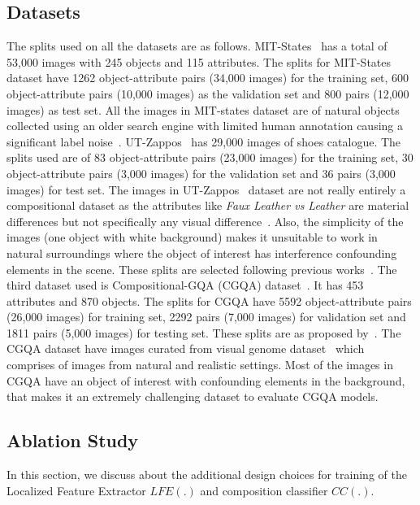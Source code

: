 \documentclass{bmvc2k}
\begin{document}
\subsection{Datasets}
The splits used on all the datasets are as follows. MIT-States~\cite{isola2015discovering} has a total of 53,000 images with 245 objects and 115 attributes. The splits for MIT-States dataset have 1262 object-attribute pairs (34,000 images) for the training set, 600 object-attribute pairs (10,000 images) as the validation set and 800 pairs (12,000 images) as test set.  All the images in MIT-states dataset are of natural objects collected using an older search engine with limited human annotation causing a significant label noise~\cite{Atzmon_casual}.
UT-Zappos~\cite{yu2017semantic} has 29,000 images of shoes catalogue. The splits used are of 83 object-attribute pairs (23,000 images) for the training set, 30 object-attribute pairs (3,000 images) for the validation set and 36 pairs (3,000 images) for test set.  The images in UT-Zappos~\cite{yu2017semantic} dataset are not really entirely a compositional dataset as the attributes like \textit{Faux Leather vs Leather} are material differences but not specifically any visual difference~\cite{mancini2021learning}. Also, the simplicity of the images (one object with white background) makes it unsuitable to work in natural surroundings where the object of interest has interference confounding elements in the scene.  These splits are selected following previous works~\cite{purushwalkam2019task, mancini2021learning}.
The third dataset used is Compositional-GQA (CGQA) dataset~\cite{hudson2019gqa, naeem2021learning}. It has 453 attributes and 870 objects. The splits for CGQA have 5592 object-attribute pairs (26,000 images) for training set, 2292 pairs (7,000 images) for validation set and 1811 pairs (5,000 images) for testing set. These splits are as proposed by~\cite{mancini2021learning}. The CGQA dataset have images curated from visual genome dataset~\cite{krishna2017visual} which comprises of images from natural and realistic settings. Most of the images in CGQA have an object of interest with confounding elements in the background, that makes it an extremely challenging dataset to evaluate CGQA models. 

\subsection{Ablation Study}
In this section, we discuss about the additional design choices for training of the Localized Feature Extractor $LFE(.)$ and composition classifier $CC(.)$.
\end{document}
